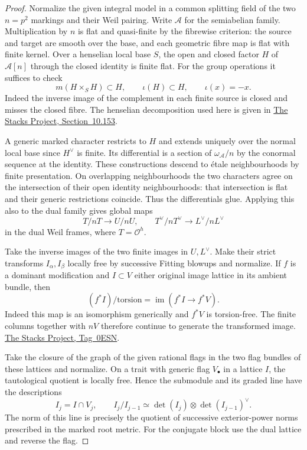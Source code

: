 \begin{proof}
Normalize the given integral model in a common splitting field of the two \(n=p^2\) markings and their Weil pairing. Write \(\mathcal A\) for the semiabelian family. Multiplication by \(n\) is flat and quasi-finite by the fibrewise criterion: the source and target are smooth over the base, and each geometric fibre map is flat with finite kernel. Over a henselian local base \(S\), the open and closed factor \(H\) of \(\mathcal A[n]\) through the closed identity is finite flat. For the group operations it suffices to check
\[
 m(H\times_SH)\subset H,\qquad \iota(H)\subset H,\qquad \iota(x)=-x .
\]
Indeed the inverse image of the complement in each finite source is closed and misses the closed fibre. The henselian decomposition used here is given in \href{https://stacks.math.columbia.edu/tag/04GE}{The Stacks Project, Section~10.153}.

A generic marked character restricts to \(H\) and extends uniquely over the normal local base since \(H^\vee\) is finite. Its differential is a section of \(\omega_{\mathcal A}/n\) by the conormal sequence at the identity. These constructions descend to \'etale neighbourhoods by finite presentation. On overlapping neighbourhoods the two characters agree on the intersection of their open identity neighbourhoods: that intersection is flat and their generic restrictions coincide. Thus the differentials glue. Applying this also to the dual family gives global maps
\[
 T/nT\longrightarrow U/nU,\qquad T^\vee/nT^\vee\longrightarrow L^\vee/nL^\vee
\]
in the dual Weil frames, where \(T=\mathcal O^h\).

Take the inverse images of the two finite images in \(U,L^\vee\). Make their strict transforms \(I_\alpha,I_\beta\) locally free by successive Fitting blowups and normalize. If \(f\) is a dominant modification and \(I\subset V\) either original image lattice in its ambient bundle, then
\[
       (f^*I)/\mathrm{torsion}=\operatorname{im}(f^*I\longrightarrow f^*V).
\]
Indeed this map is an isomorphism generically and \(f^*V\) is torsion-free. The finite columns together with \(nV\) therefore continue to generate the transformed image. \href{https://stacks.math.columbia.edu/tag/0ESN}{The Stacks Project, Tag~0ESN}.

Take the closure of the graph of the given rational flags in the two flag bundles of these lattices and normalize. On a trait with generic flag \(V_\bullet\) in a lattice \(I\), the tautological quotient is locally free. Hence the submodule and its graded line have the descriptions
\[
 I_j=I\cap V_j,\qquad I_j/I_{j-1}\simeq\det(I_j)\otimes\det(I_{j-1})^\vee .
\]
The norm of this line is precisely the quotient of successive exterior-power norms prescribed in the marked root metric. For the conjugate block use the dual lattice and reverse the flag.


\end{proof}
